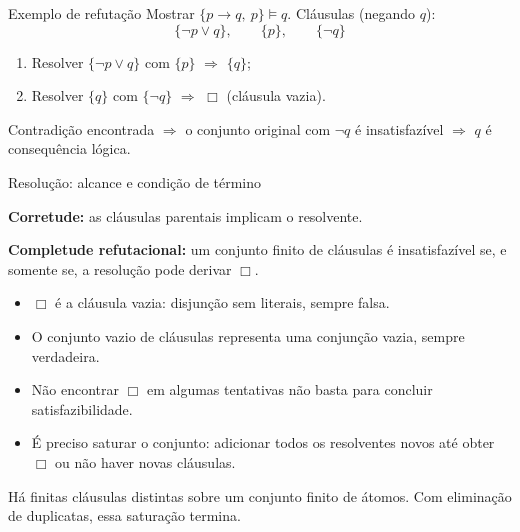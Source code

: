 \documentclass[10pt,aspectratio=169]{beamer}
\begin{document}
\begin{frame}{Exemplo de refutação}
  Mostrar $\{p\rightarrow q,\ p\}\models q$. Cláusulas (negando $q$):
  \[
    \{\neg p \lor q\},\qquad \{p\},\qquad \{\neg q\}
  \]
  \begin{enumerate}
    \item Resolver $\{\neg p\lor q\}$ com $\{p\}$ $\Rightarrow$ $\{q\}$;
    \item Resolver $\{q\}$ com $\{\neg q\}$ $\Rightarrow$ $\Box$ (cláusula vazia).
  \end{enumerate}
  Contradição encontrada $\Rightarrow$ o conjunto original com $\neg q$ é insatisfazível $\Rightarrow$ $q$ é consequência lógica.
\end{frame}


\begin{frame}{Resolução: alcance e condição de término}

\textbf{Corretude:} as cláusulas parentais implicam o resolvente.
\medskip

\textbf{Completude refutacional:} um conjunto finito de cláusulas é insatisfazível se, e somente se, a resolução pode derivar $\Box$.
\begin{itemize}
\item $\Box$ é a cláusula vazia: disjunção sem literais, sempre falsa.
\item O conjunto vazio de cláusulas representa uma conjunção vazia, sempre verdadeira.
\item Não encontrar $\Box$ em algumas tentativas não basta para concluir satisfazibilidade.
\item É preciso saturar o conjunto: adicionar todos os resolventes novos até obter $\Box$ ou não haver novas cláusulas.
\end{itemize}
Há finitas cláusulas distintas sobre um conjunto finito de átomos. Com eliminação de duplicatas, essa saturação termina.
\end{frame}
\end{document}
